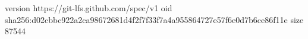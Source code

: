 version https://git-lfs.github.com/spec/v1
oid sha256:d02cbbc922a2ca98672681d4f2f7f33f7a4a955864727e57f6e0d7b6ce86f11e
size 87544

